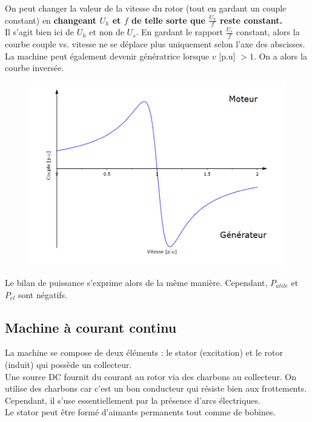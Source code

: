 \documentclass[../main.tex]{subfiles}
\begin{document}
On peut changer la valeur de la vitesse du rotor (tout en gardant un couple constant) en \textbf{changeant $U_h$ et $f$ de telle sorte que $\frac{U_h}{f}$ reste constant.}\\
\warning Il s'agit bien ici de $U_h$ et non de $U_s$. En gardant le rapport $\frac{U_s}{f}$ constant, alors la courbe couple vs. vitesse ne se déplace plus uniquement selon l'axe des abscisses.\\

La machine peut également devenir génératrice lorsque $v$ [p.u] $>1$. On a alors la courbe inversée.\\

\begin{figure}[hbt!]
    \centering
    \includegraphics[width=.8\textwidth]{IMAGES/elec/generateurelec.png}
\end{figure}

Le bilan de puissance s'exprime alors de la même manière. Cependant, $P_{utile}$ et $P_{el}$ sont négatifs.\\


\subsection{Machine à courant continu}
La machine se compose de deux éléments : le stator (excitation) et le rotor (induit) qui possède un collecteur.\\
Une source DC fournit du courant au rotor via des charbons au collecteur. On utilise des charbons car c'est un bon conducteur qui résiste bien aux frottements. Cependant, il s'use essentiellement par la présence d'arcs électriques.\\

Le stator peut être formé d'aimants permanents tout comme de bobines.\\
\end{document}
